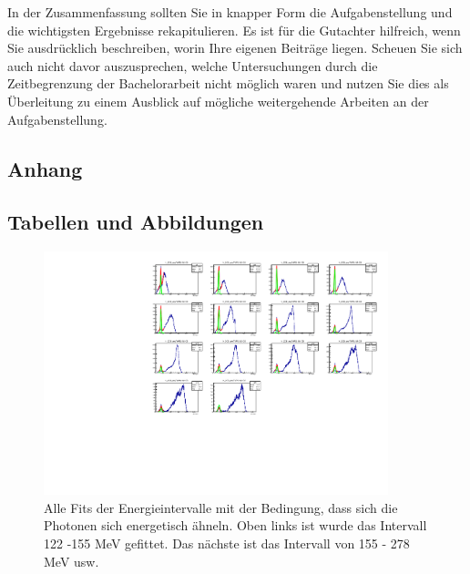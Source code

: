\documentclass[a4paper,11pt,oneside,final,german,openbib,pdftex]{scrbook}
\begin{document}
In der Zusammenfassung sollten Sie in knapper Form die Aufgabenstellung 
und die wichtigsten Ergebnisse rekapitulieren. Es ist f\"ur die 
Gutachter hilfreich, wenn Sie ausdr\"ucklich beschreiben, worin 
Ihre eigenen Beitr\"age liegen. Scheuen Sie sich auch nicht davor 
auszusprechen, welche Untersuchungen durch die Zeitbegrenzung der 
Bachelorarbeit nicht m\"oglich waren und nutzen Sie dies als 
\"Uberleitung zu einem Ausblick auf m\"ogliche weitergehende 
Arbeiten an der Aufgabenstellung.

\begin{appendix}
\chapter{Anhang}

\section{Tabellen und Abbildungen}


\begin{figure}[h!]
	\begin{center}
		\includegraphics[width=100mm]{allfitsenergyintervallwithCondition1303}
		\caption{Alle Fits der Energieintervalle mit der Bedingung, dass sich die Photonen sich energetisch ähneln. Oben links ist wurde das Intervall 122 -155 MeV gefittet. Das nächste ist das Intervall von 155 - 278 MeV usw.}
		\label{fig:similarenergyallfits}
	\end{center}
\end{figure}





\end{appendix}
\end{document}
